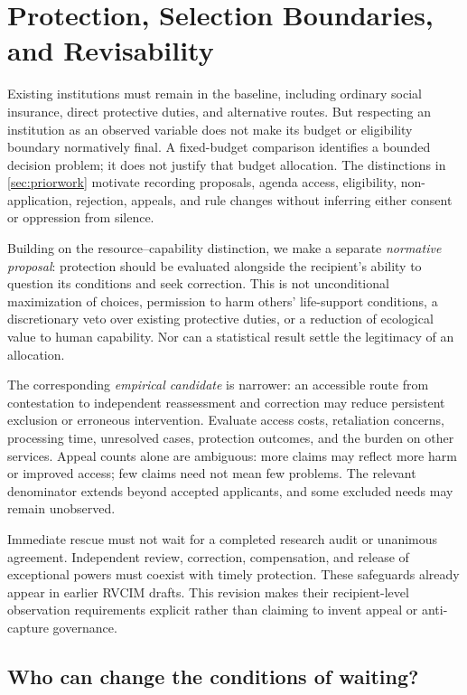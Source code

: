 \documentclass[11pt,a4paper]{article}
\numberwithin{equation}{section}
\theoremstyle{definition}
\theoremstyle{plain}
\theoremstyle{remark}
\begin{document}
\section{Protection, Selection Boundaries, and Revisability}
\label{sec:revisability}

Existing institutions must remain in the baseline, including ordinary social insurance, direct protective duties, and alternative routes. But respecting an institution as an observed variable does not make its budget or eligibility boundary normatively final. A fixed-budget comparison identifies a bounded decision problem; it does not justify that budget allocation. The distinctions in \cref{sec:priorwork} motivate recording proposals, agenda access, eligibility, non-application, rejection, appeals, and rule changes without inferring either consent or oppression from silence.

Building on the resource--capability distinction, we make a separate \emph{normative proposal}: protection should be evaluated alongside the recipient's ability to question its conditions and seek correction. This is not unconditional maximization of choices, permission to harm others' life-support conditions, a discretionary veto over existing protective duties, or a reduction of ecological value to human capability. Nor can a statistical result settle the legitimacy of an allocation.

The corresponding \emph{empirical candidate} is narrower: an accessible route from contestation to independent reassessment and correction may reduce persistent exclusion or erroneous intervention. Evaluate access costs, retaliation concerns, processing time, unresolved cases, protection outcomes, and the burden on other services. Appeal counts alone are ambiguous: more claims may reflect more harm or improved access; few claims need not mean few problems. The relevant denominator extends beyond accepted applicants, and some excluded needs may remain unobserved.

Immediate rescue must not wait for a completed research audit or unanimous agreement. Independent review, correction, compensation, and release of exceptional powers must coexist with timely protection. These safeguards already appear in earlier RVCIM drafts. This revision makes their recipient-level observation requirements explicit rather than claiming to invent appeal or anti-capture governance.

\subsection{Who can change the conditions of waiting?}
\label{sec:waitingauthority}
\end{document}
